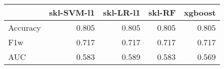 \begin{tabular}{lrrrr}
\toprule
{} &  skl-SVM-l1 &  skl-LR-l1 &  skl-RF &  xgboost \\
\midrule
Accuracy &       0.805 &      0.805 &   0.805 &    0.805 \\
F1w      &       0.717 &      0.717 &   0.717 &    0.717 \\
AUC      &       0.583 &      0.589 &   0.583 &    0.569 \\
\bottomrule
\end{tabular}
